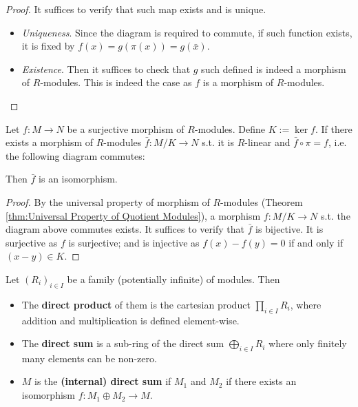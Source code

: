 \documentclass{article}
\begin{document}
\begin{proof}
    It suffices to verify that such map exists and is unique.
    \begin{itemize}
        \item \emph{Uniqueness}. Since the diagram is required to commute, if such function exists, it is fixed by $f(x) = g(\pi(x)) = g(\bar{x})$.
        \item \emph{Existence}. Then it suffices to check that $g$ such defined is indeed a morphism of $R$-modules. This is indeed the case as $f$ is a morphism of $R$-modules.
    \end{itemize}
\end{proof}

\begin{theorem}\label{thm:First Isomorphism Theorem}
    Let $f: M\to N$ be a surjective morphism of $R$-modules. Define $K := \ker f$. If there exists a morphism of $R$-modules $\bar{f}: M/K\to N$ s.t. it is $R$-linear and $\bar{f}\circ \pi = f$, i.e. the following diagram commutes:
    \begin{figure}[htbp]
        \centering
    \end{figure}

    Then $\bar{f}$ is an isomorphism.
\end{theorem}

\begin{proof}
    By the universal property of morphism of $R$-modules (Theorem \ref{thm:Universal Property of Quotient Modules}), a morphism $f: M/K\to N$ s.t. the diagram above commutes exists. It suffices to verify that $\bar{f}$ is bijective. It is surjective as $f$ is surjective; and is injective as $f(x) - f(y) = 0$ if and only if $(x - y)\in K$.
\end{proof}

\begin{definition}
    Let $(R_i)_{i\in I}$ be a family (potentially infinite) of modules. Then
    \begin{itemize}
        \item The \textbf{direct product} of them is the cartesian product $\prod_{i\in I} R_i$, where addition and multiplication is defined element-wise.
        \item The \textbf{direct sum} is a sub-ring of the direct sum $\bigoplus_{i\in I} R_i$ where only finitely many elements can be non-zero.
        \item $M$ is the \textbf{(internal) direct sum} if $M_1$ and $M_2$ if there exists an isomorphism $f: M_1 \oplus M_2 \to M$.
    \end{itemize}
\end{definition}
\end{document}
